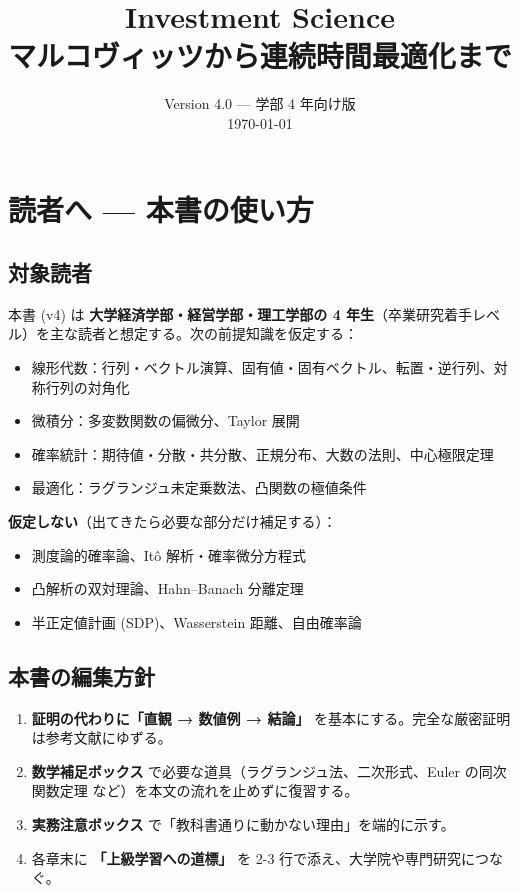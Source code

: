 \documentclass[11pt,a4paper]{report}
\title{Investment Science \\ \large マルコヴィッツから連続時間最適化まで}
\author{}
\date{Version 4.0 — 学部 4 年向け版 \\ \today}
\begin{document}
\maketitle
\tableofcontents
\clearpage

\chapter{読者へ — 本書の使い方}

\section{対象読者}

本書 (v4) は \textbf{大学経済学部・経営学部・理工学部の 4 年生}（卒業研究着手レベル）を主な読者と想定する。次の前提知識を仮定する：

\begin{itemize}
\item 線形代数：行列・ベクトル演算、固有値・固有ベクトル、転置・逆行列、対称行列の対角化
\item 微積分：多変数関数の偏微分、Taylor 展開
\item 確率統計：期待値・分散・共分散、正規分布、大数の法則、中心極限定理
\item 最適化：ラグランジュ未定乗数法、凸関数の極値条件
\end{itemize}

\textbf{仮定しない}（出てきたら必要な部分だけ補足する）：
\begin{itemize}
\item 測度論的確率論、Itô 解析・確率微分方程式
\item 凸解析の双対理論、Hahn–Banach 分離定理
\item 半正定値計画 (SDP)、Wasserstein 距離、自由確率論
\end{itemize}

\section{本書の編集方針}

\begin{enumerate}
\item \textbf{証明の代わりに「直観 → 数値例 → 結論」} を基本にする。完全な厳密証明は参考文献にゆずる。
\item \textbf{数学補足ボックス} で必要な道具（ラグランジュ法、二次形式、Euler の同次関数定理 など）を本文の流れを止めずに復習する。
\item \textbf{実務注意ボックス} で「教科書通りに動かない理由」を端的に示す。
\item 各章末に \textbf{「上級学習への道標」} を 2-3 行で添え、大学院や専門研究につなぐ。
\end{enumerate}
\end{document}
